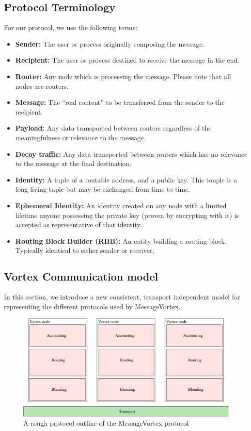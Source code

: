 \subsection{Protocol Terminology}
For our protocol, we use the following terms:
\begin{itemize}
	\item \textbf{Sender:} The user or process originally composing the message.
	\item \textbf{Recipient:} The user or process destined to receive the message in the end.
	\item \textbf{Router:} Any node which is processing the message. Please note that all nodes are routers.
	\item \textbf{Message:} The ``real content'' to be transferred from the sender to the recipient.
	\item \textbf{Payload:} Any data transported between routers regardless of the meaningfulness or relevance to the message.
	\item \textbf{Decoy traffic:} Any data transported between routers which has no relevance to the message at the final destination.
	\item \textbf{Identity:} A tuple of a routable address, and a public key. This touple is a long living tuple but may be exchanged from time to time. 
	\item \textbf{Ephemeral Identity:} An identity created on any node with a limited lifetime anyone possessing the private key (proven by encrypting with it) is accepted as representative of that identity.
	\item \textbf{Routing Block Builder (RBB):} An entity building a routing block. Typically identical to either sender or receiver.
\end{itemize}

\subsection{Vortex Communication model}
In this section, we introduce a new consistent, transport independent model for representing the different protocols used by MessageVortex.

\begin{figure}[ht!]
	\centering\includegraphics[width=\columnwidth]{inc/roughProtocolDesign.pdf}
	\caption{A rough protocol outline of the MessageVortex protocol}\label{fig:protocolOutline}
\end{figure}

